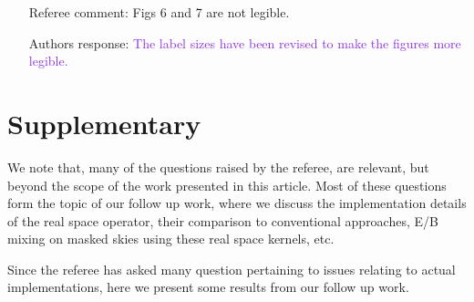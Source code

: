 \documentclass[12pt]{article}
\newcommand{\addtext}{\textcolor{BlueViolet}  }
\begin{document}
\begin{itemize}
\item[{Referee comment: }] Figs 6 and 7 are not legible.
\item[{Authors response: }] \addtext{The label sizes have been revised to make the figures more legible.}


\end{itemize}

\section*{Supplementary}
We note that, many of the questions raised by the referee, are relevant, but beyond the scope of the work presented in this article. Most of these questions form the topic of our follow up work, where we discuss the implementation details of the real space operator, their comparison to conventional approaches, E/B mixing on masked skies using these real space kernels, etc. 

Since the referee has asked many question pertaining to issues relating to actual implementations, here we present some results from our follow up work.
\end{document}
